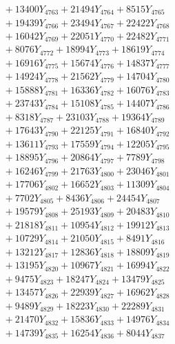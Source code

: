 \documentclass[a4paper,10pt]{article}
\begin{document}
{\begin{align}
&\;  + 13400 Y_{4763} + 21494 Y_{4764} + 8515 Y_{4765} \\[0.3ex]
&\;  + 19439 Y_{4766} + 23494 Y_{4767} + 22422 Y_{4768} \\[0.5ex]\allowbreak
&\;  + 16042 Y_{4769} + 22051 Y_{4770} + 22482 Y_{4771} \\[0.3ex]
&\;  + 8076 Y_{4772} + 18994 Y_{4773} + 18619 Y_{4774} \\[0.3ex]
&\;  + 16916 Y_{4775} + 15674 Y_{4776} + 14837 Y_{4777} \\[0.3ex]
&\;  + 14924 Y_{4778} + 21562 Y_{4779} + 14704 Y_{4780} \\[0.3ex]
&\;  + 15888 Y_{4781} + 16336 Y_{4782} + 16076 Y_{4783} \\[0.3ex]
&\;  + 23743 Y_{4784} + 15108 Y_{4785} + 14407 Y_{4786} \\[0.3ex]
&\;  + 8318 Y_{4787} + 23103 Y_{4788} + 19364 Y_{4789} \\[0.3ex]
&\;  + 17643 Y_{4790} + 22125 Y_{4791} + 16840 Y_{4792} \\[0.3ex]
&\;  + 13611 Y_{4793} + 17559 Y_{4794} + 12205 Y_{4795} \\[0.3ex]
&\;  + 18895 Y_{4796} + 20864 Y_{4797} + 7789 Y_{4798} \\[0.5ex]\allowbreak
&\;  + 16246 Y_{4799} + 21763 Y_{4800} + 23046 Y_{4801} \\[0.3ex]
&\;  + 17706 Y_{4802} + 16652 Y_{4803} + 11309 Y_{4804} \\[0.3ex]
&\;  + 7702 Y_{4805} + 8436 Y_{4806} + 24454 Y_{4807} \\[0.3ex]
&\;  + 19579 Y_{4808} + 25193 Y_{4809} + 20483 Y_{4810} \\[0.3ex]
&\;  + 21818 Y_{4811} + 10954 Y_{4812} + 19912 Y_{4813} \\[0.3ex]
&\;  + 10729 Y_{4814} + 21050 Y_{4815} + 8491 Y_{4816} \\[0.3ex]
&\;  + 13212 Y_{4817} + 12836 Y_{4818} + 18809 Y_{4819} \\[0.3ex]
&\;  + 13195 Y_{4820} + 10967 Y_{4821} + 16994 Y_{4822} \\[0.3ex]
&\;  + 9475 Y_{4823} + 18247 Y_{4824} + 13479 Y_{4825} \\[0.3ex]
&\;  + 13457 Y_{4826} + 22939 Y_{4827} + 16962 Y_{4828} \\[0.5ex]\allowbreak
&\;  + 9489 Y_{4829} + 18223 Y_{4830} + 22289 Y_{4831} \\[0.3ex]
&\;  + 21470 Y_{4832} + 15836 Y_{4833} + 14976 Y_{4834} \\[0.3ex]
&\;  + 14739 Y_{4835} + 16254 Y_{4836} + 8044 Y_{4837} \\[0.3ex]

\end{align}}
\end{document}
